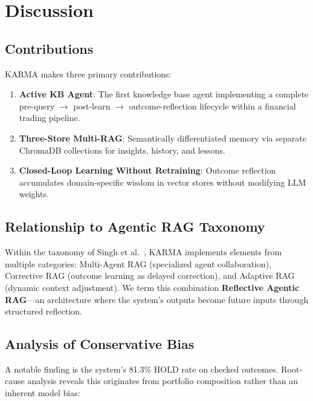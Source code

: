 \documentclass[conference]{IEEEtran}
\begin{document}
\section{Discussion}

\subsection{Contributions}

KARMA makes three primary contributions:

\begin{enumerate}
\item \textbf{Active KB Agent}: The first knowledge base agent implementing a complete pre-query $\rightarrow$ post-learn $\rightarrow$ outcome-reflection lifecycle within a financial trading pipeline.
\item \textbf{Three-Store Multi-RAG}: Semantically differentiated memory via separate ChromaDB collections for insights, history, and lessons.
\item \textbf{Closed-Loop Learning Without Retraining}: Outcome reflection accumulates domain-specific wisdom in vector stores without modifying LLM weights.
\end{enumerate}

\subsection{Relationship to Agentic RAG Taxonomy}

Within the taxonomy of Singh et al.~\cite{singh2025agenticrag}, KARMA implements elements from multiple categories: Multi-Agent RAG (specialized agent collaboration), Corrective RAG (outcome learning as delayed correction), and Adaptive RAG (dynamic context adjustment). We term this combination \textbf{Reflective Agentic RAG}---an architecture where the system's outputs become future inputs through structured reflection.

\subsection{Analysis of Conservative Bias}

A notable finding is the system's 81.3\% HOLD rate on checked outcomes. Root-cause analysis reveals this originates from portfolio composition rather than an inherent model bias:
\end{document}
